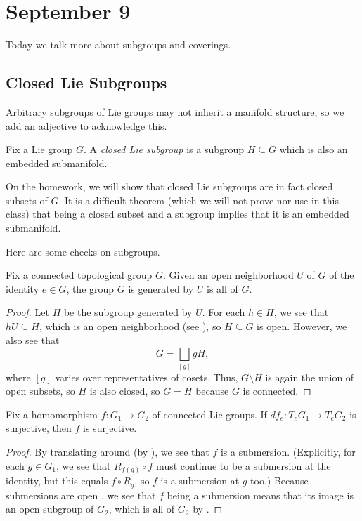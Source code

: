 \documentclass[../notes.tex]{subfiles}
\begin{document}
\section{September 9}
Today we talk more about subgroups and coverings.

\subsection{Closed Lie Subgroups}
Arbitrary subgroups of Lie groups may not inherit a manifold structure, so we add an adjective to acknowledge this.
\begin{definition}
	Fix a Lie group $G$. A \textit{closed Lie subgroup} is a subgroup $H\subseteq G$ which is also an embedded submanifold.
\end{definition}
\begin{remark}
	On the homework, we will show that closed Lie subgroups are in fact closed subsets of $G$. It is a difficult theorem (which we will not prove nor use in this class) that being a closed subset and a subgroup implies that it is an embedded submanifold.
\end{remark}
Here are some checks on subgroups.
\begin{lemma} \label{lem:neighborhood-generates}
	Fix a connected topological group $G$. Given an open neighborhood $U$ of $G$ of the identity $e\in G$, the group $G$ is generated by $U$ is all of $G$.
\end{lemma}
\begin{proof}
	Let $H$ be the subgroup generated by $U$. For each $h\in H$, we see that $hU\subseteq H$, which is an open neighborhood (see ), so $H\subseteq G$ is open. However, we also see that
	\[G=\bigsqcup_{[g]}gH,\]
	where $[g]$ varies over representatives of cosets. Thus, $G\setminus H$ is again the union of open subsets, so $H$ is also closed, so $G=H$ because $G$ is connected.
\end{proof}
\begin{lemma}
	Fix a homomorphism $f\colon G_1\to G_2$ of connected Lie groups. If $df_e\colon T_eG_1\to T_eG_2$ is surjective, then $f$ is surjective.
\end{lemma}
\begin{proof}
	By translating around (by ), we see that $f$ is a submersion. (Explicitly, for each $g\in G_1$, we see that $R_{f(g)}\circ f$ must continue to be a submersion at the identity, but this equals $f\circ R_g$, so $f$ is a submersion at $g$ too.) Because submersions are open \cite[Proposition~4.28]{lee-manifolds}, we see that $f$ being a submersion means that its image is an open subgroup of $G_2$, which is all of $G_2$ by .
\end{proof}
\end{document}

